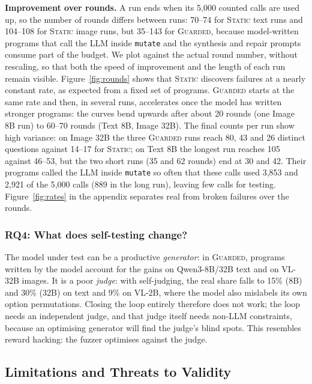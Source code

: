 \documentclass[sigconf]{acmart}
\newcommand{\HW}{\textsc{Static}}
\newcommand{\BR}{\textsc{Guarded}}
\begin{document}
\textbf{Improvement over rounds.} A run ends when its 5{,}000 counted calls are used up, so the number of rounds
differs between runs: 70--74 for \HW{} text runs and 104--108 for \HW{} image runs, but 35--143 for \BR{}, because
model-written programs that call the LLM inside \texttt{mutate} and the synthesis and repair prompts consume part of
the budget. We plot against the actual round number, without rescaling, so that both the speed of improvement and the
length of each run remain visible. Figure~\ref{fig:rounds} shows that \HW{} discovers failures at a nearly constant
rate, as expected from a fixed set of programs. \BR{} starts at the same rate and then, in several runs, accelerates
once the model has written stronger programs: the curves bend upwards after about 20 rounds (one Image 8B run) to
60--70 rounds (Text 8B, Image 32B). The final counts per run show high variance: on Image 32B the three \BR{} runs
reach 80, 43 and 26 distinct questions against 14--17 for \HW{}; on Text 8B the longest run reaches 105 against
46--53, but the two short runs (35 and 62 rounds) end at 30 and 42. Their programs called the LLM inside
\texttt{mutate} so often that these calls used 3{,}853 and 2{,}921 of the 5{,}000 calls (889 in the long run), leaving
few calls for testing. Figure~\ref{fig:rates} in the appendix separates real from broken failures over the rounds.

\subsubsection{RQ4: What does self-testing change?}

The model under test can be a productive \emph{generator}: in \BR{}, programs written by the model account for the
gains on Qwen3-8B/32B text and on VL-32B images. It is a poor \emph{judge}: with self-judging, the real share falls to
15\% (8B) and 30\% (32B) on text and 9\% on VL-2B, where the model also mislabels its own option permutations. Closing
the loop entirely therefore does not work; the loop needs an independent judge, and that judge itself needs
non-LLM constraints, because an optimising generator will find the judge's blind spots. This resembles reward
hacking: the fuzzer optimises against the judge.

\subsection{Limitations and Threats to Validity}
\label{sec:limits}
\end{document}
